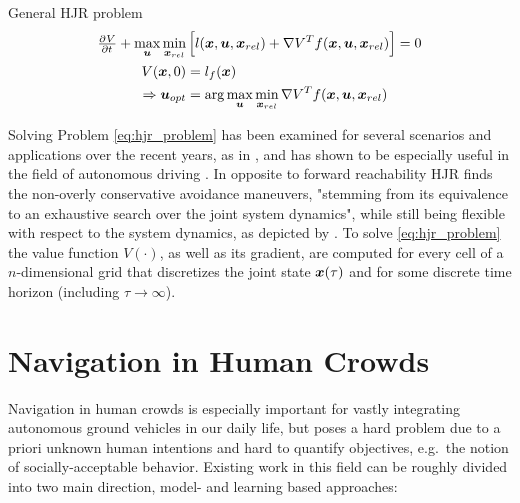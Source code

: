 \begin{problem}{General \ac{HJR} problem}
\begin{align}
\pd{V}{t} + \max_{\u}  \min_{\d} &\left[l(\x, \u, \d) + \nabla V^T f(\x, \u, \d) \right] = 0 \\ 
V(\x, 0) &= l_f(\x) \\
\Rightarrow \u_{opt} &= \arg \max_{\u}  \min_{\d} \nabla V^T f(\x, \u, \d)
\label{eq:hjr_problem_u}
\end{align}
\label{eq:hjr_problem}
\end{problem}

Solving Problem \ref{eq:hjr_problem} has been examined for several scenarios and applications over the recent years, as in \cite{Dhinakaran2017}\cite{Margellos2009}\cite{Chen2017b}, and has shown to be especially useful in the field of autonomous driving \cite{Althoff2009}\cite{Althoff2014}\cite{Althoff2010}. In opposite to forward reachability \ac{HJR} finds the non-overly conservative avoidance maneuvers, "stemming from its equivalence to an exhaustive search over the joint system dynamics", while still being flexible with respect to the system dynamics, as depicted by \cite{Leung2020}. To solve \ref{eq:hjr_problem} the value function $V(\cdot)$, as well as its gradient, are computed for every cell of a $n$-dimensional grid that discretizes the joint state $\boldsymbol{x}(\tau)$ and for some discrete time horizon (including $\tau \rightarrow \infty$). 

\section{Navigation in Human Crowds}
\label{text:related/crowd_navigation}
Navigation in human crowds is especially important for vastly integrating autonomous ground vehicles in our daily life, but poses a hard problem due to a priori unknown human intentions and hard to quantify objectives, e.g.\ the notion of socially-acceptable behavior. Existing work in this field can be roughly divided into two main direction, model- and learning based approaches: 

